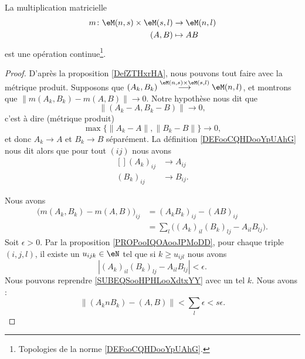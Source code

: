 \begin{proposition}     \label{PROPooOEETooPhqWuf}
	La multiplication matricielle
	\begin{equation}
		\begin{aligned}
			m\colon \eM(n,s)\times \eM(s,l) & \to \eM(n,l) \\
			(A,B)                           & \mapsto AB
		\end{aligned}
	\end{equation}
	est une opération continue\footnote{Topologies de la norme \ref{DEFooCQHDooYpUAhG}.}.
\end{proposition}

\begin{proof}
	D'après la proposition \ref{DefZTHxrHA}, nous pouvons tout faire avec la métrique produit. Supposons que \( (A_k,B_k)  \stackrel{ \eM(n,s)\times \eM(s,l) }{\longrightarrow} \eM(n,l) \), et montrons que \( \| m(A_k,B_k)-m(A,B) \|\to 0\). Notre hypothèse nous dit que
	\begin{equation}
		\| (A_k-A,B_k-B) \|\to 0,
	\end{equation}
	c'est à dire (métrique produit)
	\begin{equation}
		\max\big\{  \| A_k-A \|,\| B_k-B \| \big\}\to 0,
	\end{equation}
	et donc \( A_k\to A\) et \( B_k\to B\) séparément. La définition \ref{DEFooCQHDooYpUAhG} nous dit alors que pour tout \( (ij)\) nous avons
	\begin{equation}
		\begin{aligned}[]
			(A_k)_{ij} & \to A_{ij}  \\
			(B_k)_{ij} & \to B_{ij}.
		\end{aligned}
	\end{equation}

	Nous avons
	\begin{subequations}		\label{SUBEQSooHPHLooXdtxYY}
		\begin{align}
			\Big( m(A_k,B_k)-m(A,B) \Big)_{ij} & =(A_kB_k)_{ij}-(AB)_{ij}                               \\
			                                   & = \sum_l\Big( (A_k)_{il}(B_k)_{lj}-A_{il}B_{lj} \Big).
		\end{align}
	\end{subequations}
	Soit \( \epsilon>0\). Par la proposition \ref{PROPooIQOAooJPMoDD}, pour chaque triple \( (i,j,l)\), il existe un \( u_{ijk}\in \eN\) tel que si \( k\geq u_{ijl}\) nous avons
	\begin{equation}
		| (A_k)_{il}(B_k)_{lj}-A_{il}B_{lj} |<\epsilon.
	\end{equation}
	Nous pouvons reprendre \eqref{SUBEQSooHPHLooXdtxYY} avec un tel \( k\). Nous avons :
	\begin{equation}
		\| (A_knB_k)-(A,B) \|<\sum_l\epsilon<s\epsilon.
	\end{equation}
\end{proof}
